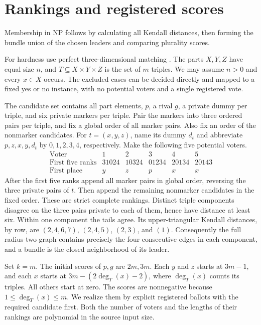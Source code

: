 \documentclass[11pt,a4paper]{amsart}
\begin{document}
\section{Rankings and registered scores}

Membership in NP follows by calculating all Kendall distances, then forming the bundle union of the chosen leaders and comparing plurality scores.

For hardness use perfect three-dimensional matching \cite[problem~17]{karp}. The parts \(X,Y,Z\) have equal size \(n\), and \(T\subseteq X\times Y\times Z\) is the set of \(m\) triples. We may assume \(n>0\) and every \(x\in X\) occurs. The excluded cases can be decided directly and mapped to a fixed yes or no instance, with no potential voters and a single registered vote.

The candidate set contains all part elements, \(p\), a rival \(g\), a private dummy per triple, and six private markers per triple. Pair the markers into three ordered pairs per triple, and fix a global order of all marker pairs. Also fix an order of the nonmarker candidates. For \(t=(x,y,z)\), name its dummy \(d_t\) and abbreviate \(p,z,x,y,d_t\) by \(0,1,2,3,4\), respectively. Make the following five potential voters.
\[
\begin{array}{c|ccccc}
\text{Voter} & 1&2&3&4&5\\ \hline
\text{First five ranks}&31024&10324&01234&20134&20143\\
\text{First place}&y&z&p&x&x
\end{array}
\]
After the first five ranks append all marker pairs in global order, reversing the three private pairs of \(t\). Then append the remaining nonmarker candidates in the fixed order. These are strict complete rankings. Distinct triple components disagree on the three pairs private to each of them, hence have distance at least six. Within one component the tails agree. Its upper-triangular Kendall distances, by row, are \((2,4,6,7)\), \((2,4,5)\), \((2,3)\), and \((1)\). Consequently the full radius-two graph contains precisely the four consecutive edges in each component, and a bundle is the closed neighborhood of its leader.

Set \(k=m\). The initial scores of \(p,g\) are \(2m,3m\). Each \(y\) and \(z\) starts at \(3m-1\), and each \(x\) starts at \(3m-(2\deg_T(x)-2)\), where \(\deg_T(x)\) counts its triples. All others start at zero. The scores are nonnegative because \(1\le\deg_T(x)\le m\). We realize them by explicit registered ballots with the required candidate first. Both the number of voters and the lengths of their rankings are polynomial in the source input size.
\end{document}
